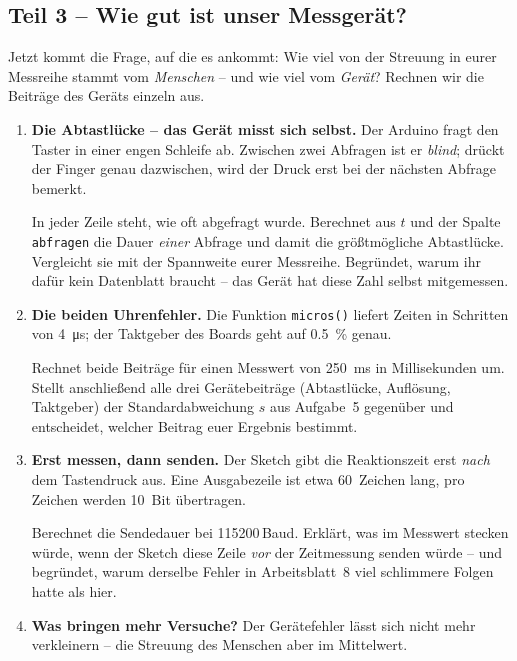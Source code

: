 \documentclass[a4paper,12pt]{scrartcl}
\begin{document}
\subsection*{Teil 3 -- Wie gut ist unser Messgerät?}

\noindent Jetzt kommt die Frage, auf die es ankommt: Wie viel von der Streuung in eurer Messreihe
stammt vom \emph{Menschen} -- und wie viel vom \emph{Gerät}? Rechnen wir die Beiträge des Geräts
einzeln aus.

\begin{enumerate}[leftmargin=2em, resume, itemsep=9pt, topsep=7pt]
\item \textbf{Die Abtastlücke -- das Gerät misst sich selbst.} Der Arduino fragt den Taster in
einer engen Schleife ab. Zwischen zwei Abfragen ist er \emph{blind}; drückt der Finger genau
dazwischen, wird der Druck erst bei der nächsten Abfrage bemerkt.

\smallskip
In jeder Zeile steht, wie oft abgefragt wurde. Berechnet aus $t$ und der Spalte
\texttt{abfragen} die Dauer \emph{einer} Abfrage und damit die größtmögliche Abtastlücke.
Vergleicht sie mit der Spannweite eurer Messreihe. Begründet, warum ihr dafür kein Datenblatt
braucht -- das Gerät hat diese Zahl selbst mitgemessen.

\item \textbf{Die beiden Uhrenfehler.} Die Funktion \texttt{micros()} liefert Zeiten in Schritten
von \SI{4}{\micro\second}; der Taktgeber des Boards geht auf \SI{0,5}{\percent} genau.

\smallskip
Rechnet beide Beiträge für einen Messwert von \SI{250}{\milli\second} in Millisekunden um. Stellt
anschließend alle drei Gerätebeiträge (Abtastlücke, Auflösung, Taktgeber) der Standardabweichung
$s$ aus Aufgabe~5 gegenüber und entscheidet, welcher Beitrag euer Ergebnis bestimmt.

\item \textbf{Erst messen, dann senden.} Der Sketch gibt die Reaktionszeit erst \emph{nach} dem
Tastendruck aus. Eine Ausgabezeile ist etwa 60~Zeichen lang, pro Zeichen werden 10~Bit übertragen.

\smallskip
Berechnet die Sendedauer bei 115200\,Baud. Erklärt, was im Messwert stecken würde, wenn der Sketch
diese Zeile \emph{vor} der Zeitmessung senden würde -- und begründet, warum derselbe Fehler in
Arbeitsblatt~8 viel schlimmere Folgen hatte als hier.

\item \textbf{Was bringen mehr Versuche?} Der Gerätefehler lässt sich nicht mehr verkleinern --
die Streuung des Menschen aber im Mittelwert.


\end{enumerate}
\end{document}
